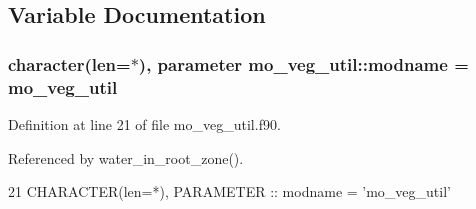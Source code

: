 \subsection{Variable Documentation}
\hypertarget{namespacemo__veg__util_a7c115cfdb9def27cc2cb0f8a8332485f}{}
\subsubsection[{modname}]{\setlength{\rightskip}{0pt plus 5cm}character(len=$\ast$), parameter mo\+\_\+veg\+\_\+util\+::modname = \textquotesingle{}mo\+\_\+veg\+\_\+util\textquotesingle{}}\label{namespacemo__veg__util_a7c115cfdb9def27cc2cb0f8a8332485f}


Definition at line 21 of file mo\+\_\+veg\+\_\+util.\+f90.



Referenced by water\+\_\+in\+\_\+root\+\_\+zone().


\begin{DoxyCode}
21   \textcolor{keywordtype}{CHARACTER(len=*)}, \textcolor{keywordtype}{PARAMETER} :: modname = \textcolor{stringliteral}{'mo\_veg\_util'}
\end{DoxyCode}
